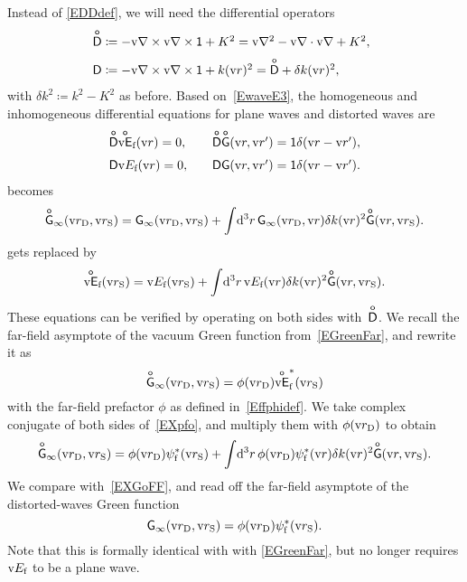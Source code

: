 \iffalse
{}%
Instead of \cref{EDDdef}, we will need the differential operators
\begin{equation}
  \begin{array}{@{}l}
    \TDo \coloneqq -\Nabla\times\Nabla\times\ONE+K^2
          = \Nabla^2-\Nabla\cdot\Nabla+K^2, \\[1.4ex]
   \TD \coloneqq -\Nabla\times\Nabla\times\ONE+k(\r)^2 = \TDo + \delta k(\r)^2,
  \end{array}
\end{equation}
with $\delta k^2\coloneqq k^2-K^2$ as before.
Based on~\cref{EwaveE3},
the homogeneous and inhomogeneous differential equations
for plane waves and distorted waves are
\begin{equation}
  \begin{array}{l@{\hspace{2em}}l}
    \TDo\Efo  (\r) = 0, &\TDo\TGo(\r,\r') = \ONE\delta(\r-\r'), \\[1.4ex]
    \TD\Ef(\r) = 0, &\TD  \TG  (\r,\r') = \ONE\delta(\r-\r').
  \end{array}
\end{equation}
 becomes
\begin{equation}\label{EXGoFF}
  \mathsf{\overset{o}{G}}_\infty(\text{v}{r}_\text{D},\text{v}{r}_\text{S})
  = \mathsf{G}_\infty(\text{v}{r}_\text{D},\text{v}{r}_\text{S}) + \int\!\mathrm d^3r\, \mathsf{G}_\infty(\text{v}{r}_\text{D},\text{v}{r})\delta k(\text{v}{r})^2 \mathsf{\overset{o}{G}}(\text{v}{r},\text{v}{r}_\text{S}).
\end{equation}
 gets replaced by
\begin{equation}\label{EXpfo}
  \mathsf{\overset{o}{\text{v}{E}}}_{\text{f}}(\text{v}{r}_\text{S}) = \text{v}{E}_{\text{f}}(\text{v}{r}_\text{S}) + \int\!\mathrm d^3r\, \text{v}{E}_{\text{f}}(\text{v}{r})\delta k(\text{v}{r})^2 \mathsf{\overset{o}{G}}(\text{v}{r},\text{v}{r}_\text{S}).
\end{equation}
These equations can be verified by operating on both sides with~$\mathsf{\overset{o}{D}}$.
We recall the far-field asymptote of the vacuum Green function from~\cref{EGreenFar},
and rewrite it as
\begin{equation}
  \mathsf{\overset{o}{G}}_\infty(\text{v}{r}_\text{D},\text{v}{r}_\text{S}) = \phi(\text{v}{r}_\text{D})\mathsf{\overset{o}{\text{v}{E}}}_{\text{f}}^*(\text{v}{r}_\text{S})
\end{equation}
with the far-field prefactor $\phi$ as defined in~\cref{Effphidef}.
We take complex conjugate of both sides of~\cref{EXpfo},
 and multiply them with $\phi(\text{v}{r}_\text{D})$ to obtain
\begin{equation}\label{EXpfo2}
  \mathsf{\overset{o}{G}}_\infty(\text{v}{r}_\text{D},\text{v}{r}_\text{S})
  = \phi(\text{v}{r}_\text{D})\psi^*_{\text{f}}(\text{v}{r}_\text{S}) + \int\!\mathrm d^3r\, \phi(\text{v}{r}_\text{D})\psi^*_{\text{f}}(\text{v}{r})\delta k(\text{v}{r})^2 \mathsf{\overset{o}{G}}(\text{v}{r},\text{v}{r}_\text{S}).
\end{equation}
We compare with~\cref{EXGoFF},
and read off the far-field asymptote of the distorted-waves Green function
\begin{equation}
  \mathsf{G}_\infty(\text{v}{r}_\text{D},\text{v}{r}_\text{S}) = \phi(\text{v}{r}_\text{D})\psi^*_{\text{f}}(\text{v}{r}_\text{S}).
\end{equation}
Note that this is formally identical with with \cref{EGreenFar},
but no longer requires $\text{v}{E}_{\text{f}}$ to be a plane wave.
%

